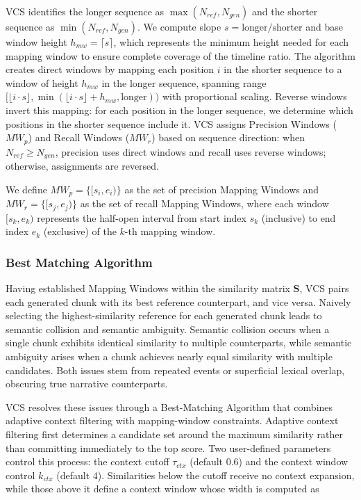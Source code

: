 \documentclass[main.tex]{subfiles}
\begin{document}
VCS identifies the longer sequence as $\max(N_{ref}, N_{gen})$ and the shorter sequence as $\min(N_{ref}, N_{gen})$. We compute slope $s = \text{longer}/\text{shorter}$ and base window height $h_{mw} = \lceil s \rceil$, which represents the minimum height needed for each mapping window to ensure complete coverage of the timeline ratio. The algorithm creates direct windows by mapping each position $i$ in the shorter sequence to a window of height $h_{mw}$ in the longer sequence, spanning range $[\lfloor i \cdot s \rfloor, \min(\lfloor i \cdot s \rfloor + h_{mw}, \text{longer}))$ with proportional scaling. Reverse windows invert this mapping: for each position in the longer sequence, we determine which positions in the shorter sequence include it. VCS assigns Precision Windows ($MW_p$) and Recall Windows ($MW_r$) based on sequence direction: when $N_{ref} \geq N_{gen}$, precision uses direct windows and recall uses reverse windows; otherwise, assignments are reversed.

We define $MW_p = \{[s_i, e_i)\}$ as the set of precision Mapping Windows and $MW_r = \{[s_j, e_j)\}$ as the set of recall Mapping Windows, where each window $[s_k, e_k)$ represents the half-open interval from start index $s_k$ (inclusive) to end index $e_k$ (exclusive) of the $k$-th mapping window.

\subsubsection{Best Matching Algorithm}
Having established Mapping Windows within the similarity matrix $\mathbf{S}$, VCS pairs each generated chunk with its best reference counterpart, and vice versa. Naively selecting the highest-similarity reference for each generated chunk leads to semantic collision and semantic ambiguity. Semantic collision occurs when a single chunk exhibits identical similarity to multiple counterparts, while semantic ambiguity arises when a chunk achieves nearly equal similarity with multiple candidates. Both issues stem from repeated events or superficial lexical overlap, obscuring true narrative counterparts.

VCS resolves these issues through a Best-Matching Algorithm that combines adaptive context filtering with mapping-window constraints. Adaptive context filtering first determines a candidate set around the maximum similarity rather than committing immediately to the top score. Two user-defined parameters control this process: the context cutoff $\tau_{ctx}$ (default 0.6) and the context window control $k_{ctx}$ (default 4). Similarities below the cutoff receive no context expansion, while those above it define a context window whose width is computed as
\end{document}
